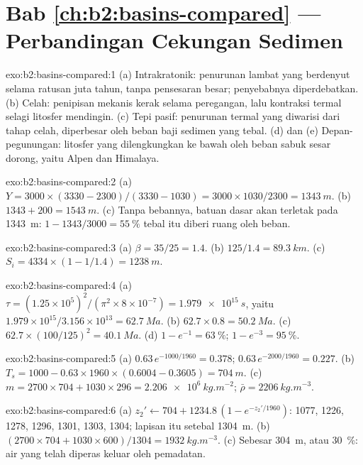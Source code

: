 \section*{Bab \ref{ch:b2:basins-compared} --- Perbandingan Cekungan Sedimen}

\begin{solution}{exo:b2:basins-compared:1}
(a) Intrakratonik: penurunan lambat yang berdenyut selama ratusan juta tahun, tanpa pensesaran
besar; penyebabnya diperdebatkan. (b) Celah: penipisan mekanis kerak selama peregangan,
lalu kontraksi termal selagi litosfer mendingin. (c) Tepi pasif: penurunan termal
yang diwarisi dari tahap celah, diperbesar oleh beban baji sedimen yang tebal. (d) dan (e)
Depan-pegunungan: litosfer yang dilengkungkan ke bawah oleh beban sabuk sesar dorong, yaitu Alpen dan Himalaya.
\end{solution}

\begin{solution}{exo:b2:basins-compared:2}
(a) $Y = 3000\times(3330 - 2300)/(3330 - 1030) = 3000\times1030/2300 = \qty{1343}{m}$.
(b) $1343 + 200 = \qty{1543}{m}$. (c) Tanpa bebannya, batuan dasar akan terletak pada \qty{1343}{m}:
$1 - 1343/3000 = \qty{55}{\percent}$ tebal itu diberi ruang oleh beban.
\end{solution}

\begin{solution}{exo:b2:basins-compared:3}
(a) $\beta = 35/25 = 1.4$. (b) $125/1.4 = \qty{89.3}{km}$. (c) $S_i = 4334\times(1 - 1/1.4) =
\qty{1238}{m}$.
\end{solution}

\begin{solution}{exo:b2:basins-compared:4}
(a) $\tau = (1.25\times10^{5})^2/(\pi^2\times8\times10^{-7}) = \qty{1.979e15}{s}$, yaitu
$1.979\times10^{15}/3.156\times10^{13} = \qty{62.7}{Ma}$. (b) $62.7\times0.8 = \qty{50.2}{Ma}$.
(c) $62.7\times(100/125)^2 = \qty{40.1}{Ma}$. (d) $1 - e^{-1} = \qty{63}{\percent}$; $1 -
e^{-3} = \qty{95}{\percent}$.
\end{solution}

\begin{solution}{exo:b2:basins-compared:5}
(a) $0.63\,e^{-1000/1960} = 0.378$; $0.63\,e^{-2000/1960} = 0.227$. (b) $T_s = 1000 -
0.63\times1960\times(0.6004 - 0.3605) = \qty{704}{m}$. (c) $m = 2700\times704 + 1030\times296 =
\qty{2.206e6}{kg.m^{-2}}$; $\bar\rho = \qty{2206}{kg.m^{-3}}$.
\end{solution}

\begin{solution}{exo:b2:basins-compared:6}
(a) $z_2' \leftarrow 704 + 1234.8\,(1 - e^{-z_2'/1960})$: 1077, 1226, 1278, 1296, 1301, 1303,
1304; lapisan itu setebal \qty{1304}{m}. (b) $(2700\times704 + 1030\times600)/1304 =
\qty{1932}{kg.m^{-3}}$. (c) Sebesar \qty{304}{m}, atau \qty{30}{\percent}: air yang telah diperas keluar oleh
pemadatan.
\end{solution}

